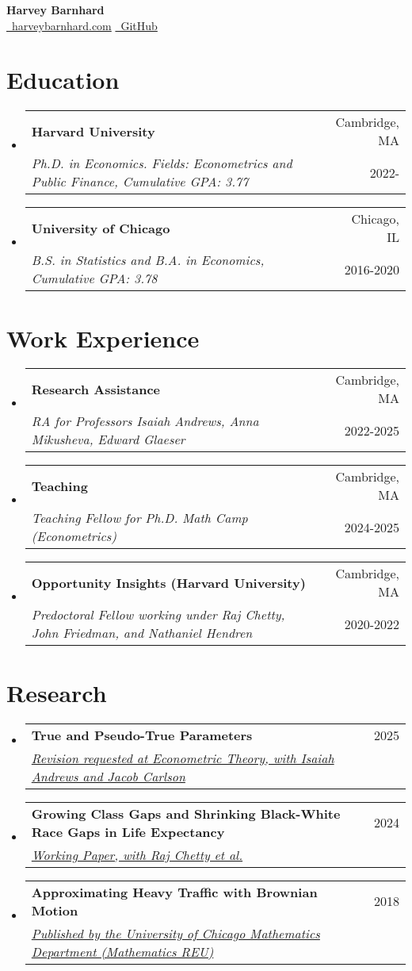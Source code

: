 \documentclass[12pt,]{article}
\makeatletter
\newcommand{\resumeSubheading}[4]{
  \vspace{-2pt}\item
    \begin{tabular*}{0.97\textwidth}[t]{l@{\extracolsep{\fill}}r}
      \textbf{#1} & #2 \\
      \textit{\small#3} & {\small #4} \\
    \end{tabular*}\vspace{-7pt}
}
\makeatother
\begin{document}
\begin{center} 
{\huge \bfseries Harvey Barnhard\\}
{\href{https://harveybarnhard.com}{\faGlobe\ harveybarnhard.com} }
{\href{https://github.com/harveybarnhard}{\faGithub\ GitHub}\\ }
\end{center}

\section*{Education}
\begin{itemize}[leftmargin=0.09in, label={}]
\resumeSubheading
      {Harvard University}{Cambridge, MA}
      {Ph.D. in Economics. Fields: Econometrics and Public Finance, Cumulative GPA: 3.77}{2022-}
\resumeSubheading
      {University of Chicago}{Chicago, IL}
      {B.S. in Statistics and B.A. in Economics, Cumulative GPA: 3.78}{2016-2020}
\end{itemize}

\section*{Work Experience}
\begin{itemize}[leftmargin=0.09in, label={}]
\resumeSubheading
      {Research Assistance}{Cambridge, MA}
      {RA for Professors Isaiah Andrews, Anna Mikusheva, Edward Glaeser}{2022-2025}
\resumeSubheading
      {Teaching}{Cambridge, MA}
      {Teaching Fellow for Ph.D. Math Camp (Econometrics)}{2024-2025}
\resumeSubheading
      {Opportunity Insights (Harvard University)}{Cambridge, MA}
      {Predoctoral Fellow working under Raj Chetty, John Friedman, and Nathaniel Hendren}{2020-2022}
\end{itemize}

\section*{Research}
\begin{itemize}[leftmargin=0.09in, label={}]
\resumeSubheading
      {True and Pseudo-True Parameters}{2025}
      {\href{https://economics.mit.edu/sites/default/files/2024-04/True\%20and\%20Pseudo-True\%20Parameters.pdf}{{\scriptsize \faLink} Revision requested at Econometric Theory, with Isaiah Andrews and Jacob Carlson}}{}
\resumeSubheading
      {Growing Class Gaps and Shrinking Black-White Race Gaps in Life Expectancy}{2024}
      {\href{https://www.nber.org/conferences/si-2024-workshop-aging}{{\scriptsize \faLink}Working Paper, with Raj Chetty et al.}}{}
\resumeSubheading
      {Approximating Heavy Traffic with Brownian Motion}{2018}
      {\href{http://math.uchicago.edu/~may/REU2018/REUPapers/Barnhard.pdf}{{\scriptsize \faLink} Published by the University of Chicago Mathematics Department (Mathematics REU)}}{}
\end{itemize}
\end{document}
